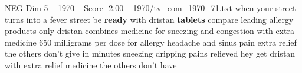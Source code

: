 \begin{textsample}{NEG Dim 5 – 1970 – Score -2.00 – 1970/tv\_com\_1970\_71.txt}  \label{ex:f5_neg_059}
when your street turns into a fever street be \textbf{ready} with dristan \textbf{tablets} compare leading allergy products only dristan combines medicine for sneezing and congestion with extra medicine 650 milligrams per dose for allergy headache and sinus pain extra relief the others don't give in minutes sneezing dripping pains relieved hey get dristan with extra relief medicine the others don't have

\end{textsample}
